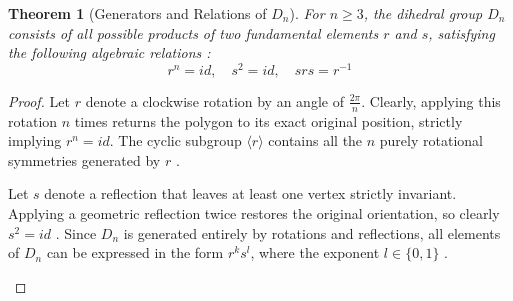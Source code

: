 \documentclass[11pt]{article}
\theoremstyle{definition}
\theoremstyle{plain}
\newtheorem{theorem}{Theorem}[section]
\theoremstyle{remark}
\begin{document}
\begin{theorem}[Generators and Relations of $D_n$]
For $n \ge 3$, the dihedral group $D_n$ consists of all possible products of two fundamental elements $r$ and $s$, satisfying the following algebraic relations \cite{dummit}:
\begin{equation}
    r^n = id, \quad s^2 = id, \quad srs = r^{-1}
\end{equation}
\end{theorem}

\begin{proof}
Let $r$ denote a clockwise rotation by an angle of $\frac{2\pi}{n}$. Clearly, applying this rotation $n$ times returns the polygon to its exact original position, strictly implying $r^n = id$. The cyclic subgroup $\langle r \rangle$ contains all the $n$ purely rotational symmetries generated by $r$ \cite{fraleigh}.
    
Let $s$ denote a reflection that leaves at least one vertex strictly invariant. Applying a geometric reflection twice restores the original orientation, so clearly $s^2 = id$ \cite{gallian}. 
Since $D_n$ is generated entirely by rotations and reflections, all elements of $D_n$ can be expressed in the form $r^k s^l$, where the exponent $l \in \{0, 1\}$ \cite{dummit}.

\begin{figure}[H]
    \centering
\end{figure}
\end{proof}
\end{document}
